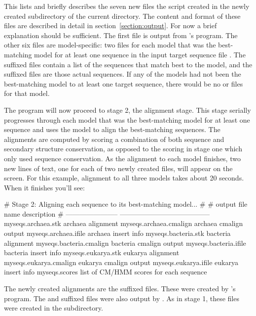 This lists and briefly describes the seven new files the script created
in the newly created  subdirectory of the current directory.
The content and format of these files are described
in detail in section~\ref{section:output}. For now a brief explanation
should be sufficient. The first file  is output from
's  program. The other six files are
model-specific: two files for each model that was the best-matching
model for at least one sequence in the input target sequence file
. The  suffixed files contain a list
of the sequences that match best to the model, and the 
suffixed files are those actual sequences. If any of the models had
not been the best-matching model to at least one target sequence,
there would be no  or  files for that
model.

The program will now proceed to stage 2, the alignment stage. This
stage serially progresses through each model that was the
best-matching model for at least one sequence and uses the model to
align the best-matching sequences. The alignments are computed by scoring
a combination of both sequence and secondary structure conservation,
as opposed to the scoring in stage one which only used sequence
conservation. As the alignment to each model finishes, two new lines
of text, one for each of two newly created files, will appear on the
screen. For this example, alignment to all three models takes about 20
seconds. When it finishes you'll see:

\begin{sreoutput}
# Stage 2: Aligning each sequence to its best-matching model...
#
# output file name         description
# -----------------------  ---------------------------------------
  myseqs.archaea.stk       archaea alignment
  myseqs.archaea.cmalign   archaea cmalign output
  myseqs.archaea.ifile     archaea insert info
  myseqs.bacteria.stk      bacteria alignment
  myseqs.bacteria.cmalign  bacteria cmalign output
  myseqs.bacteria.ifile    bacteria insert info
  myseqs.eukarya.stk       eukarya alignment
  myseqs.eukarya.cmalign   eukarya cmalign output
  myseqs.eukarya.ifile     eukarya insert info
  myseqs.scores            list of CM/HMM scores for each sequence
\end{sreoutput}

The newly created alignments are the  suffixed files. These
were created by 's  program. The
 and  suffixed files were also output by
. As in stage 1, these files were created in the
 subdirectory. 

